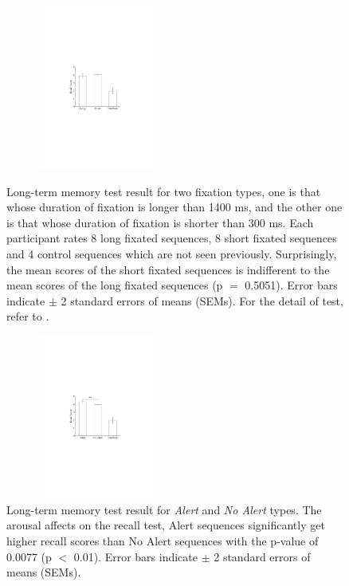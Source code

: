 \documentclass[oneside,master]{snueethesis}
\begin{document}
\begin{figure}
  \begin{minipage}{.5\textwidth}\centerline{\includegraphics[width=60mm,height=54mm,trim=58mm 110mm 62mm 105mm]{./eps/memtest_leng}}
  \caption[Long-term memory test result for two fixation duration types]{Long-term memory test result for two fixation types, one is that whose duration of fixation is longer than 1400 ms, and the other one is that whose duration of fixation is shorter than 300 ms. Each participant rates 8 long fixated sequences, 8 short fixated sequences and 4 control sequences which are not seen previously. Surprisingly, the mean scores of the short fixated sequences is indifferent to the mean scores of the long fixated sequences (p $=$ 0.5051). Error bars indicate $\pm$ 2 standard errors of means (SEMs). For the detail of test, refer to \textit{}.}
  \label{fig:memtest-leng}
  \end{minipage}
  
  \vskip 0.12in

  \begin{minipage}{.5\textwidth}\centerline{\includegraphics[width=60mm,height=54mm,trim=58mm 110mm 62mm 105mm]{./eps/memtest_alert}}
  \caption[Long-term memory test result for Alert and No Alert types]{Long-term memory test result for \textit{Alert} and \textit{No Alert} types. The arousal affects on the recall test, Alert sequences significantly get higher recall scores than No Alert sequences with the p-value of 0.0077 (p $<$ 0.01). Error bars indicate $\pm$ 2 standard errors of means (SEMs).}
  \label{fig:memtest-alert}
  \end{minipage}
\end{figure}
\end{document}
